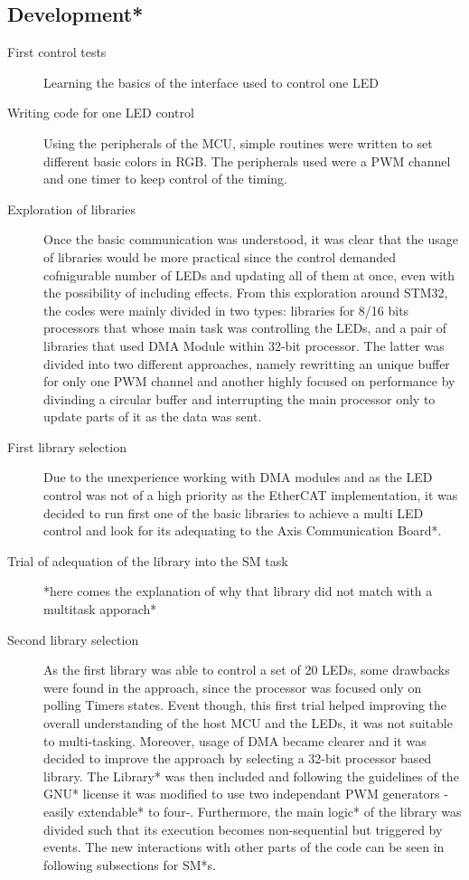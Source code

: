 \subsection{Development*}
\begin{description}
\item[First control tests] Learning the basics of the interface used to control one LED
\item[Writing code for one LED control] Using the peripherals of the MCU, simple routines were written to set different basic colors in RGB. The peripherals used were a PWM channel and one timer to keep control of the timing.
\item[Exploration of libraries] Once the basic communication was understood, it was clear that the usage of libraries would be more practical since the control demanded cofnigurable number of LEDs and updating all of them at once, even with the possibility of including effects. From this exploration around STM32, the codes were mainly divided in two types: libraries for 8/16 bits processors that whose main task was controlling the LEDs, and a pair of libraries that used DMA Module within 32-bit processor. The latter was divided into two different approaches, namely rewritting an unique buffer for only one PWM channel and another highly focused on performance by divinding a circular buffer and interrupting the main processor only to update parts of it as the data was sent.
\item[First library selection] Due to the unexperience working with DMA modules and as the LED control was not of a high priority as the EtherCAT implementation, it was decided to run first one of the basic libraries to achieve a multi LED control and look for its adequating to the Axis Communication Board*.
\item[Trial of adequation of the library into the SM task] *here comes the explanation of why that library did not match with a multitask apporach*
\item[Second library selection] As the first library was able to control a set of 20 LEDs, some drawbacks were found in the approach, since the processor was focused only on polling Timers states. Event though, this first trial helped improving the overall understanding of the host MCU and the LEDs, it was not suitable to multi-tasking. Moreover, usage of DMA became clearer and it was decided to improve the approach by selecting a 32-bit processor based library. The Library* was then included and following the guidelines of the GNU* license it was modified to use two independant PWM generators -easily extendable* to four-. Furthermore, the main logic* of the library was divided such that its execution becomes non-sequential but triggered by events. The new interactions with other parts of the code can be seen in following subsections for SM*s.
\end{description}



